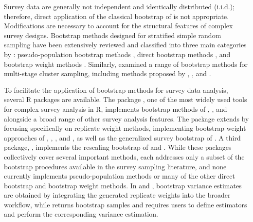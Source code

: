 Survey data are generally not independent and identically distributed (i.i.d.); therefore, direct application of the classical bootstrap of \citet{Efron:1979} is not appropriate. Modifications are necessary to account for the structural features of complex survey designs. Bootstrap methods designed for stratified simple random sampling have been extensively reviewed and classified into three main categories by \citet{Mashreghi:Haziza:Leger:2016}: pseudo-population bootstrap methods \citep{Bickel:Freedman:1984, Chao:Lo:1985, Sitter:1992a, Booth:Butler:Hall:1994, Chao:Lo:1994}, direct bootstrap methods \citep{McCarthy:Snowden:1985, Rao:Wu:1988, Sitter:1992b}, and bootstrap weight methods \citep{Rao:Wu:Yue:1992, Chipperfield:Preston:2007, Beaumont:Patak:2012, Bertail:Combris:1997}. Similarly, \citet{Chen:Haziza:Mashreghi:2022} examined a range of bootstrap methods for multi-stage cluster sampling, including methods proposed by \citet{Rao:Wu:Yue:1992}, \citet{Preston:2009}, and \citet{Chauvet:2007}.

To facilitate the application of bootstrap methods for survey data analysis, several R packages are available. The  package \citep{Lumley:2004}, one of the most widely used tools for complex survey analysis in R, implements bootstrap methods of \citet{Canty:Davison:1999}, \citet{Rao:Wu:1988}, and \citet{Preston:2009} alongside a broad range of other survey analysis features. The  package \citep{Schneider:2025} extends  by focusing specifically on replicate weight methods, implementing bootstrap weight approaches of \citet{Canty:Davison:1999}, \citet{Preston:2009}, \citet{Rao:Wu:Yue:1992}, and \citet{Beaumont:Emond:2022}, as well as the generalized survey bootstrap of \citet{Beaumont:Patak:2012}. A third package,  \citep{Feehan:2023}, implements the rescaling bootstrap of \citet{Rao:Wu:1988} and \citet{Rust:Rao:1996}. While these packages collectively cover several important methods, each addresses only a subset of the bootstrap procedures available in the survey sampling literature, and none currently implements pseudo-population methods or many of the other direct bootstrap and bootstrap weight methods. In  and , bootstrap variance estimates are obtained by integrating the generated replicate weights into the broader  workflow, while  returns bootstrap samples and requires users to define estimators and perform the corresponding variance estimation.

